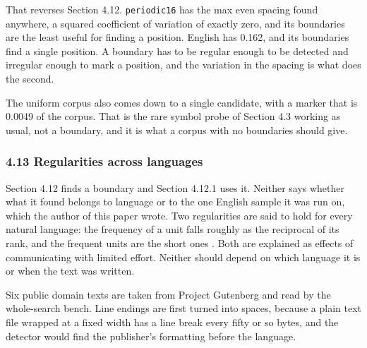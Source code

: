 That reverses Section 4.12. \texttt{periodic16} has the max even spacing found anywhere, a squared coefficient of variation of exactly zero, and its boundaries are the least useful for finding a position. English has 0.162, and its boundaries find a single position. A boundary has to be regular enough to be detected and irregular enough to mark a position, and the variation in the spacing is what does the second.

The uniform corpus also comes down to a single candidate, with a marker that is 0.0049 of the corpus. That is the rare symbol probe of Section 4.3 working as usual, not a boundary, and it is what a corpus with no boundaries should give.

\subsubsection{4.13 Regularities across languages}

Section 4.12 finds a boundary and Section 4.12.1 uses it. Neither says whether what it found belongs to language or to the one English sample it was run on, which the author of this paper wrote. Two regularities are said to hold for every natural language: the frequency of a unit falls roughly as the reciprocal of its rank, and the frequent units are the short ones \cite{src:Zipf}. Both are explained as effects of communicating with limited effort. Neither should depend on which language it is or when the text was written.

Six public domain texts are taken from Project Gutenberg \cite{src:Project-Gutenberg} and read by the whole-search bench. Line endings are first turned into spaces, because a plain text file wrapped at a fixed width has a line break every fifty or so bytes, and the detector would find the publisher's formatting before the language.

